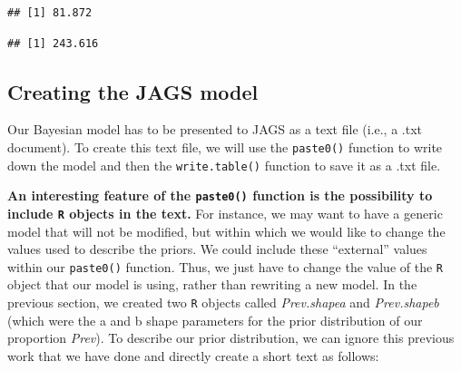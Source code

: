 \documentclass[
]{book}
\newenvironment{Shaded}{\begin{snugshade}}{\end{snugshade}}
\newcommand{\CommentTok}[1]{\textcolor[rgb]{0.56,0.35,0.01}{\textit{#1}}}
\newcommand{\NormalTok}[1]{#1}
\newcommand{\OtherTok}[1]{\textcolor[rgb]{0.56,0.35,0.01}{#1}}
\newcommand{\SpecialCharTok}[1]{\textcolor[rgb]{0.81,0.36,0.00}{\textbf{#1}}}
\begin{document}
\begin{verbatim}
## [1] 81.872
\end{verbatim}

\begin{Shaded}
\end{Shaded}

\begin{verbatim}
## [1] 243.616
\end{verbatim}

\begin{Shaded}
\end{Shaded}

\subsection{Creating the JAGS model}\label{creating-the-jags-model}

Our Bayesian model has to be presented to JAGS as a text file (i.e., a .txt document). To create this text file, we will use the \texttt{paste0()} function to write down the model and then the \texttt{write.table()} function to save it as a .txt file.

\textbf{An interesting feature of the \texttt{paste0()} function is the possibility to include \texttt{R} objects in the text.} For instance, we may want to have a generic model that will not be modified, but within which we would like to change the values used to describe the priors. We could include these ``external'' values within our \texttt{paste0()} function. Thus, we just have to change the value of the \texttt{R} object that our model is using, rather than rewriting a new model. In the previous section, we created two \texttt{R} objects called \emph{Prev.shapea} and \emph{Prev.shapeb} (which were the a and b shape parameters for the prior distribution of our proportion \emph{Prev}). To describe our prior distribution, we can ignore this previous work that we have done and directly create a short text as follows:
\end{document}
